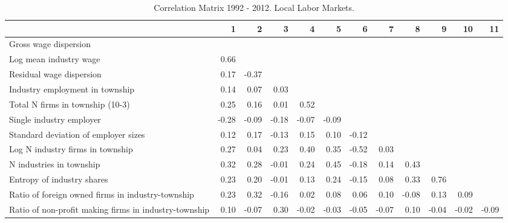 \begin{table}[htb]
\centering
\caption{Correlation Matrix 1992 - 2012. Local Labor Markets.} 
\begin{tabular}{lrrrrrrrrrrr}
  \hline
 & 1 & 2 & 3 & 4 & 5 & 6 & 7 & 8 & 9 & 10 & 11 \\ 
  \hline
Gross wage dispersion &  &  &  &  &  &  &  &  &  &  &  \\ 
  Log mean industry wage & 0.66 &  &  &  &  &  &  &  &  &  &  \\ 
  Residual wage dispersion & 0.17 & -0.37 &  &  &  &  &  &  &  &  &  \\ 
  Industry employment in township & 0.14 & 0.07 & 0.03 &  &  &  &  &  &  &  &  \\ 
  Total N firms in township (10-3) & 0.25 & 0.16 & 0.01 & 0.52 &  &  &  &  &  &  &  \\ 
  Single industry employer & -0.28 & -0.09 & -0.18 & -0.07 & -0.09 &  &  &  &  &  &  \\ 
  Standard deviation of employer sizes & 0.12 & 0.17 & -0.13 & 0.15 & 0.10 & -0.12 &  &  &  &  &  \\ 
  Log N industry firms in township & 0.27 & 0.04 & 0.23 & 0.40 & 0.35 & -0.52 & 0.03 &  &  &  &  \\ 
  N industries in township & 0.32 & 0.28 & -0.01 & 0.24 & 0.45 & -0.18 & 0.14 & 0.43 &  &  &  \\ 
  Entropy of industry shares & 0.23 & 0.20 & -0.01 & 0.13 & 0.24 & -0.15 & 0.08 & 0.33 & 0.76 &  &  \\ 
  Ratio of foreign owned firms in industry-township & 0.23 & 0.32 & -0.16 & 0.02 & 0.08 & 0.06 & 0.10 & -0.08 & 0.13 & 0.09 &  \\ 
  Ratio of non-profit making firms in industry-township & 0.10 & -0.07 & 0.30 & -0.02 & -0.03 & -0.05 & -0.07 & 0.10 & -0.04 & -0.02 & -0.09 \\ 
   \hline
\end{tabular}
\end{table}
